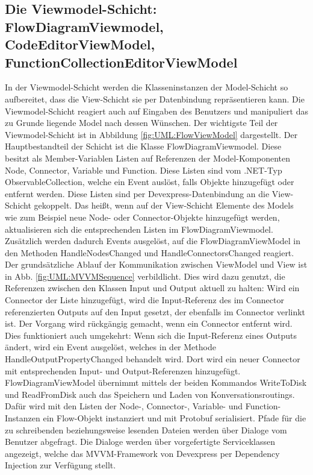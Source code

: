 \subsection[Die Viewmodel-Schicht]{Die Viewmodel-Schicht: FlowDiagramViewmodel, CodeEditorViewModel, FunctionCollectionEditorViewModel}
\label{subsec:Die Viewmodel-Schicht}
In der Viewmodel-Schicht werden die Klasseninstanzen der Model-Schicht so aufbereitet, dass die View-Schicht sie per Datenbindung repräsentieren kann. Die Viewmodel-Schicht reagiert auch auf Eingaben des Benutzers und manipuliert das zu Grunde liegende Model nach dessen Wünschen. 
\newline
Der wichtigste Teil der Viewmodel-Schicht ist in Abbildung \ref{fig:UML:FlowViewModel} dargestellt. Der Hauptbestandteil der Schicht ist die Klasse FlowDiagramViewmodel. Diese besitzt als Member-Variablen Listen auf Referenzen der Model-Komponenten Node, Connector, Variable und Function. Diese Listen sind vom .NET-Typ ObservableCollection, welche ein Event auslöst, falls Objekte hinzugefügt oder entfernt werden. Diese Listen sind per Devexpress-Datenbindung an die View-Schicht gekoppelt. Das heißt, wenn auf der View-Schicht Elemente des Models wie zum Beispiel neue Node- oder Connector-Objekte hinzugefügt werden, aktualisieren sich die entsprechenden Listen im FlowDiagramViewmodel. Zusätzlich werden dadurch Events ausgelöst, auf die FlowDiagramViewModel in den Methoden HandleNodesChanged und HandleConnectorsChanged reagiert. Der grundsätzliche Ablauf der Kommunikation zwischen ViewModel und View ist in Abb. \ref{fig:UML:MVVMSequence} verbildlicht. Dies wird dazu genutzt, die Referenzen zwischen den Klassen Input und Output aktuell zu halten: Wird ein Connector der Liste hinzugefügt, wird die Input-Referenz des im Connector referenzierten Outputs auf den Input gesetzt, der ebenfalls im Connector verlinkt ist. Der Vorgang wird rückgängig gemacht, wenn ein Connector entfernt wird. Dies funktioniert auch umgekehrt: Wenn sich die Input-Referenz eines Outputs ändert, wird ein Event ausgelöst, welches in der Methode HandleOutputPropertyChanged behandelt wird. Dort wird ein neuer Connector mit entsprechenden Input- und Output-Referenzen hinzugefügt.
\newline 
FlowDiagramViewModel übernimmt mittels der beiden Kommandos WriteToDisk und ReadFromDisk auch das Speichern und Laden von Konversationsroutings. Dafür wird mit den Listen der Node-, Connector-, Variable- und Function-Instanzen ein Flow-Objekt instanziert und mit Protobuf serialisiert. Pfade für die zu schreibenden beziehungsweise lesenden Dateien werden über Dialoge vom Benutzer abgefragt. Die Dialoge werden über vorgefertigte Serviceklassen angezeigt, welche das MVVM-Framework von Devexpress per Dependency Injection zur Verfügung stellt. 
